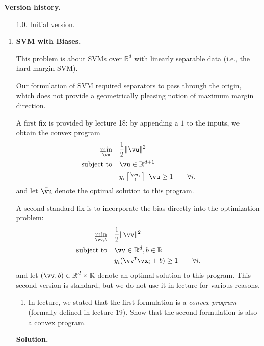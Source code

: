 \documentclass{article}
\newcommand\T{{\scriptscriptstyle\mathsf{T}}}
\def\R{\mathbb{R}}
\def\1{\mathds{1}}
\theoremstyle{definition}
\theoremstyle{remark}
\newenvironment{Q}
{%
\clearpage
\item
}
{%
\phantom{s}%
\bigskip%
\noindent\textbf{Solution.}
}
\begin{document}
\noindent\textbf{Version history.}
\begin{enumerate}
    \item[1.0.] Initial version.
\end{enumerate}

\begin{enumerate}[font={\Large\bfseries},left=0pt]

\begin{Q}
  \textbf{\Large{}SVM with Biases.}

  This problem is about SVMs over $\R^d$ with linearly separable data
  (i.e., the hard margin SVM).

  Our formulation of SVM required separators to pass through the origin, which 
  does not provide a geometrically pleasing notion of maximum margin direction.

  A first fix is provided by lecture 18: by appending a $1$ to the inputs,
  we obtain the convex program
  \begin{align*}
    \min_{\vu}\quad&\frac 1 2 \|\vu\|^2\\
    \textrm{subject to}\quad&\vu\in\R^{d+1}\\
                            &y_i \sbr[1]{\begin{smallmatrix}\vx_i\\1\end{smallmatrix}}^\T \vu
                            \geq 1\qquad\forall i,
  \end{align*}
  and let $\bar\vu$ denote the optimal solution to this program.

  A second standard fix is to incorporate the bias directly into the optimization problem:
  \begin{align*}
    \min_{\vv,b}\quad&\frac 1 2 \|\vv\|^2\\
    \textrm{subject to}\quad&\vv\in\R^{d}, b\in\R\\
                            &y_i (\vv^\T \vx_i + b) \geq 1\qquad\forall i,
  \end{align*}
  and let $(\bar\vv,\bar b) \in \R^d \times \R$ denote an optimal solution to this program.
  This second version is standard, but we do not use it in lecture for various reasons.

  \begin{enumerate}
    \item
      In lecture, we stated that the first formulation is a \emph{convex program}
      (formally defined in lecture 19).
      Show that the second formulation is also a convex program.


\end{enumerate}
\end{Q}
\end{enumerate}
\end{document}
